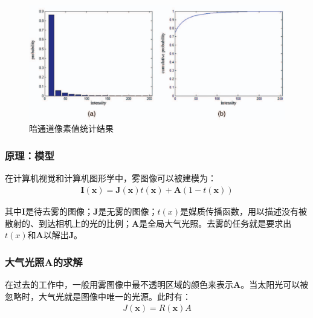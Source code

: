 \documentclass[UTF8]{ctexart}
\begin{document}
    			\begin{figure}[htbp]
    				\centering 
         			\includegraphics[scale=0.5]{statistic.png} 
    				\caption{暗通道像素值统计结果} 
    				\label{statistic}
    			\end{figure}
        
            \subsubsection{原理：模型} \label{principle : model}
            
            \indent 在计算机视觉和计算机图形学中，雾图像可以被建模为：  
                \begin{align}
                    \mathbf{I}\left( \mathbf{x} \right) = \mathbf{J}\left( \mathbf{x} \right) t\left( \mathbf{x} \right) + \mathbf{A}\left( 1 - t\left( \mathbf{x} \right) \right) \label{model : haze image}
                \end{align}
                     
            \indent 其中$\mathbf{I}$是待去雾的图像；$\mathbf{J}$是无雾的图像；$t\left( x \right)$是媒质传播函数，用以描述没有被散射的、到达相机上的光的比例；$\mathbf{A}$是全局大气光照。去雾的任务就是要求出$t\left( x \right)$和$\mathbf{A}$以解出$\mathbf{J}$。
            
            \subsubsection*{大气光照$\mathbf{A}$的求解}
                \indent 在过去的工作中，一般用雾图像中最不透明区域的颜色来表示$\mathbf{A}$。当太阳光可以被忽略时，大气光就是图像中唯一的光源。此时有：
                    \begin{align}
                        J\left( \mathbf{x} \right) = R\left( \mathbf{x} \right)A \label{model : no haze when sunlight ignored}
                    \end{align}
                
\end{document}
